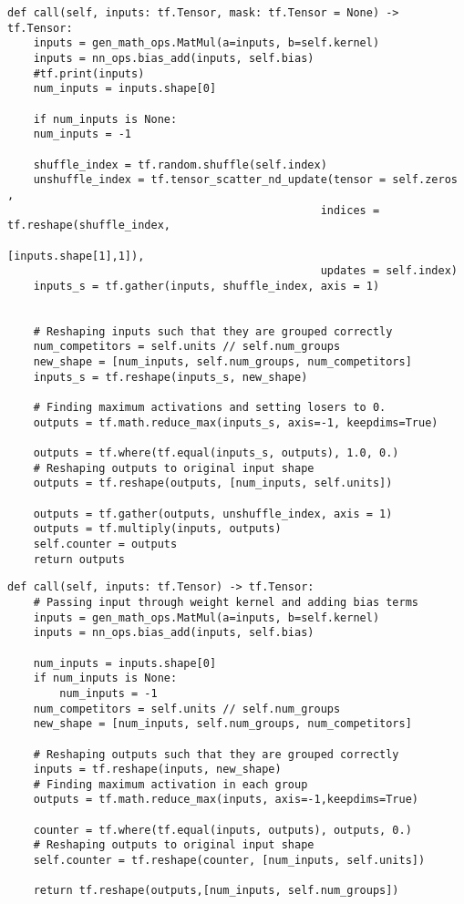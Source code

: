 \lstset{style=Python}
\begin{lstlisting}[caption={Python implementation for the custom activation function used to define the \ac{SCO} layer.},captionpos=b, label={lst:channel_out}]
    def call(self, inputs: tf.Tensor, mask: tf.Tensor = None) -> tf.Tensor:
    inputs = gen_math_ops.MatMul(a=inputs, b=self.kernel)
    inputs = nn_ops.bias_add(inputs, self.bias)
    #tf.print(inputs)
    num_inputs = inputs.shape[0]

    if num_inputs is None:
    num_inputs = -1

    shuffle_index = tf.random.shuffle(self.index)
    unshuffle_index = tf.tensor_scatter_nd_update(tensor = self.zeros , 
                                                indices = tf.reshape(shuffle_index, 
                                                                    [inputs.shape[1],1]), 
                                                updates = self.index)
    inputs_s = tf.gather(inputs, shuffle_index, axis = 1)


    # Reshaping inputs such that they are grouped correctly
    num_competitors = self.units // self.num_groups
    new_shape = [num_inputs, self.num_groups, num_competitors]
    inputs_s = tf.reshape(inputs_s, new_shape)

    # Finding maximum activations and setting losers to 0.
    outputs = tf.math.reduce_max(inputs_s, axis=-1, keepdims=True)

    outputs = tf.where(tf.equal(inputs_s, outputs), 1.0, 0.)
    # Reshaping outputs to original input shape
    outputs = tf.reshape(outputs, [num_inputs, self.units])

    outputs = tf.gather(outputs, unshuffle_index, axis = 1) 
    outputs = tf.multiply(inputs, outputs)
    self.counter = outputs
    return outputs 
\end{lstlisting}

\lstset{style=Python}
\begin{lstlisting}[caption={Python implementation for the custom activation function used to define the max-out layer.},captionpos=b, label={lst:max_out}]
def call(self, inputs: tf.Tensor) -> tf.Tensor:
    # Passing input through weight kernel and adding bias terms
    inputs = gen_math_ops.MatMul(a=inputs, b=self.kernel)
    inputs = nn_ops.bias_add(inputs, self.bias)

    num_inputs = inputs.shape[0]
    if num_inputs is None:
        num_inputs = -1
    num_competitors = self.units // self.num_groups
    new_shape = [num_inputs, self.num_groups, num_competitors]

    # Reshaping outputs such that they are grouped correctly
    inputs = tf.reshape(inputs, new_shape)
    # Finding maximum activation in each group
    outputs = tf.math.reduce_max(inputs, axis=-1,keepdims=True)

    counter = tf.where(tf.equal(inputs, outputs), outputs, 0.)
    # Reshaping outputs to original input shape
    self.counter = tf.reshape(counter, [num_inputs, self.units])

    return tf.reshape(outputs,[num_inputs, self.num_groups])   
\end{lstlisting}
\newpage